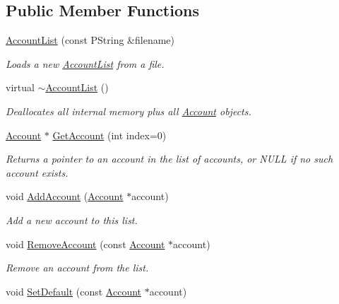 \subsection*{Public Member Functions}
\begin{CompactItemize}
\item 
\hyperlink{classAccountList_8e8092c5a958a03625dc9ff1915c8225}{AccountList} (const PString \&filename)
\begin{CompactList}\small\item\em Loads a new \hyperlink{classAccountList}{AccountList} from a file. \item\end{CompactList}\item 
virtual \hyperlink{classAccountList_77acd32be8700d21271e8802d87e2b15}{$\sim$AccountList} ()
\begin{CompactList}\small\item\em Deallocates all internal memory plus all \hyperlink{classAccount}{Account} objects. \item\end{CompactList}\item 
\hyperlink{classAccount}{Account} $\ast$ \hyperlink{classAccountList_c3d69942a3a661112f5a141bbbb80909}{GetAccount} (int index=0)
\begin{CompactList}\small\item\em Returns a pointer to an account in the list of accounts, or NULL if no such account exists. \item\end{CompactList}\item 
void \hyperlink{classAccountList_58880040232e0a6ba7e77096e26b6347}{AddAccount} (\hyperlink{classAccount}{Account} $\ast$account)
\begin{CompactList}\small\item\em Add a new account to this list. \item\end{CompactList}\item 
void \hyperlink{classAccountList_16a6b337fc14bce5ee4dd31f854592fc}{RemoveAccount} (const \hyperlink{classAccount}{Account} $\ast$account)
\begin{CompactList}\small\item\em Remove an account from the list. \item\end{CompactList}\item 
void \hyperlink{classAccountList_e94a2c11a78e44ac3724018d4142cbd7}{SetDefault} (const \hyperlink{classAccount}{Account} $\ast$account)

\end{CompactItemize}

